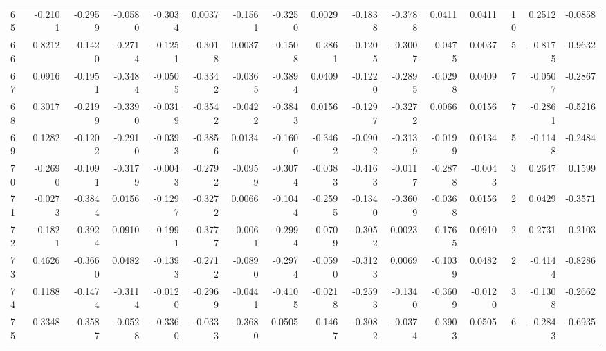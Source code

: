 \begin{tabular}{lrrrrrrrrrrrrrrr}
65  &     -0.2101 & -0.2959 & -0.0580 & -0.3034 &  0.0037 & -0.1561 & -0.3250 &  0.0029 & -0.1838 & -0.3788 &   0.0411 &     0.0411 &     10 &                    0.2512 &                    -0.0858 \\
66  &      0.8212 & -0.1420 & -0.2714 & -0.1251 & -0.3018 &  0.0037 & -0.1508 & -0.2861 & -0.1205 & -0.3007 &  -0.0475 &     0.0037 &      5 &                   -0.8175 &                    -0.9632 \\
67  &      0.0916 & -0.1951 & -0.3484 & -0.0505 & -0.3342 & -0.0365 & -0.3894 &  0.0409 & -0.1220 & -0.2895 &  -0.0298 &     0.0409 &      7 &                   -0.0507 &                    -0.2867 \\
68  &      0.3017 & -0.2199 & -0.3390 & -0.0319 & -0.3542 & -0.0422 & -0.3843 &  0.0156 & -0.1297 & -0.3272 &   0.0066 &     0.0156 &      7 &                   -0.2861 &                    -0.5216 \\
69  &      0.1282 & -0.1202 & -0.2910 & -0.0393 & -0.3856 &  0.0134 & -0.1600 & -0.3462 & -0.0902 & -0.3139 &  -0.0199 &     0.0134 &      5 &                   -0.1148 &                    -0.2484 \\
70  &     -0.2690 & -0.1091 & -0.3179 & -0.0043 & -0.2792 & -0.0959 & -0.3074 & -0.0383 & -0.4163 & -0.0117 &  -0.2878 &    -0.0043 &      3 &                    0.2647 &                     0.1599 \\
71  &     -0.0273 & -0.3844 &  0.0156 & -0.1297 & -0.3272 &  0.0066 & -0.1044 & -0.2595 & -0.1340 & -0.3609 &  -0.0368 &     0.0156 &      2 &                    0.0429 &                    -0.3571 \\
72  &     -0.1821 & -0.3924 &  0.0910 & -0.1991 & -0.3777 & -0.0061 & -0.2994 & -0.0709 & -0.3052 &  0.0023 &  -0.1765 &     0.0910 &      2 &                    0.2731 &                    -0.2103 \\
73  &      0.4626 & -0.3660 &  0.0482 & -0.1393 & -0.2712 & -0.0890 & -0.2974 & -0.0590 & -0.3123 &  0.0069 &  -0.1039 &     0.0482 &      2 &                   -0.4144 &                    -0.8286 \\
74  &      0.1188 & -0.1474 & -0.3114 & -0.0120 & -0.2969 & -0.0441 & -0.4105 & -0.0218 & -0.2593 & -0.1340 &  -0.3609 &    -0.0120 &      3 &                   -0.1308 &                    -0.2662 \\
75  &      0.3348 & -0.3587 & -0.0528 & -0.3360 & -0.0333 & -0.3680 &  0.0505 & -0.1467 & -0.3082 & -0.0374 &  -0.3903 &     0.0505 &      6 &                   -0.2843 &                    -0.6935 \\

\end{tabular}
